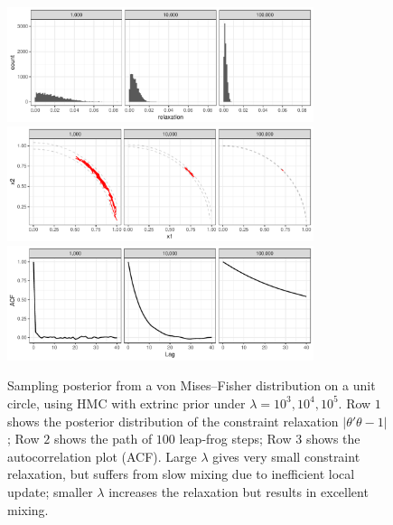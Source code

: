 \documentclass[10pt]{article}
\DeclareMathOperator{\1}{\mathbbm{1}}
\begin{document}
\begin{figure}[H]
 \centering
    \includegraphics[width=0.8\textwidth]{unit_circle_violation}
  \includegraphics[width=0.8\textwidth]{unit_circle_100steps}
 \includegraphics[width=0.8\textwidth]{unit_circle_acf}
\caption{Sampling posterior from a von Mises--Fisher distribution on a unit circle, using HMC with extrinc prior under $\lambda=10^3,10^4,10^5$. Row $1$ shows the posterior distribution of the constraint relaxation $|\theta'\theta -1|$; Row $2$ shows the path of $100$ leap-frog steps; Row $3$ shows the autocorrelation plot (ACF). Large $\lambda$ gives very small constraint relaxation, but suffers from slow mixing due to inefficient local update; smaller $\lambda$ increases the relaxation but results in excellent mixing.}
\label{unit_circle}
\end{figure}
\end{document}
